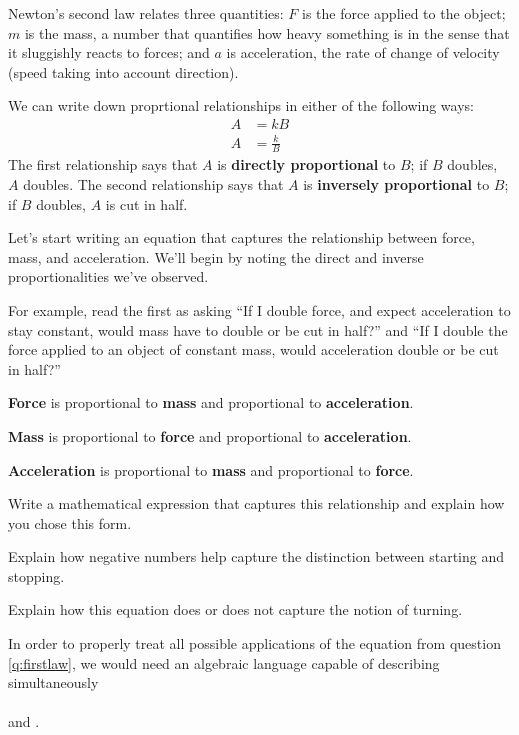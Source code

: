 \documentclass{handout}
\begin{document}
Newton's second law relates three quantities: $F$ is the force applied to the object; $m$ is the mass, a number that quantifies how heavy something is in the sense that it sluggishly reacts to forces; and $a$ is acceleration, the rate of change of velocity (speed taking into account direction).

We can write down proprtional relationships in either of the following ways:
\begin{align*}
    A&= k B \\
A &= \frac{k}{B} 
\end{align*}
The first relationship says that $A$ is \textbf{directly proportional} to $B$; if $B$ doubles, $A$ doubles. The second relationship says that $A$ is \textbf{inversely proportional} to $B$; if $B$ doubles, $A$ is cut in half.

Let's start writing an equation that captures the relationship between force, mass, and acceleration. We'll begin by noting the direct and inverse proportionalities we've observed. 

For example, read the first as asking ``If I double force, and expect acceleration to stay constant, would mass have to double or be cut in half?'' and ``If I double the force applied to an object of constant mass, would acceleration double or be cut in half?''
\answerspace{\baselineskip}

\begin{questions}
    \question \textbf{Force} is \blank[2in] proportional to \textbf{mass} and \blank[2in] proportional to \textbf{acceleration}.

\answerspace{\baselineskip}
    \question \textbf{Mass} is \blank[2in] proportional to \textbf{force} and \blank[2in] proportional to \textbf{acceleration}.

\answerspace{\baselineskip}

    \question \textbf{Acceleration} is \blank[2in] proportional to \textbf{mass} and \blank[2in] proportional to \textbf{force}.

\answerspace{\baselineskip}
\clearpage
    \question \label{q:firstlaw} Write a mathematical expression that captures this relationship and explain how you chose this form. 

    \answerspace{\fill}

    \question Explain how negative numbers help capture the distinction between starting and stopping.

    \answerspace{\fill}

    \question Explain how this equation does or does not capture the notion of turning. 

    \answerspace{\fill}
    \answerspace{.5in}

    \question In order to properly treat all possible applications of the equation from question \ref{q:firstlaw}, we would need an algebraic language capable of describing simultaneously\\~ \\ \blank[2in] and \blank[2in].


\end{questions}
\end{document}
